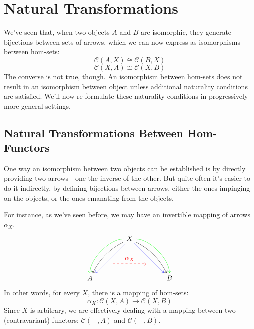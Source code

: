 \documentclass[DaoFP]{subfiles}
\begin{document}
\setcounter{chapter}{8}

\chapter{Natural Transformations}

We've seen that, when two objects $A$ and $B$ are isomorphic, they generate bijections between sets of arrows, which we can now express as isomorphisms between hom-sets:
\[\mathcal{C}(A, X) \cong \mathcal{C}(B, X)\]
\[\mathcal{C}(X, A) \cong \mathcal{C}(X, B)\]
The converse is not true, though. An isomorphism between hom-sets does not result in an isomorphism between object unless additional naturality conditions are satisfied. We'll now re-formulate these naturality conditions in progressively more general settings.

\section{Natural Transformations Between Hom-Functors}

One way an isomorphism between two objects can be established is by directly providing two arrows---one the inverse of the other. But quite often it's easier to do it indirectly, by defining bijections between arrows, either the ones impinging on the objects, or the ones emanating from the objects. 

For instance, as we've seen before, we may have an invertible mapping of arrows $\alpha_X$.
\[
 \begin{tikzcd}
 \node(x) at (0, 2) {X};
 \node(a) at (-2, 0) {A};
 \node(b) at (2, 0) {B};
 \node(c1) at (-1, 1.5) {};
 \node(c2) at (-1.5, 1) {};
 \node(c3) at (-1, 2) {};
 \node(c4) at (-2, 1) {};
 \node(d1) at (1, 1.5) {};
 \node(d2) at (1.5, 1) {};
 \node(d3) at (1, 2) {};
 \node(d4) at (2, 1) {};
\node (aa) at (-1, 0.75) {};
 \node (bb) at (1, 0.75) {};
 \draw[->] (x) .. controls (c1)  and (c2) .. (a); %
 \draw[->, green] (x) .. controls (c3)  and (c4) .. (a); %
 \draw[->, blue] (x) -- (a); 
  \draw[->] (x) .. controls (d1)  and (d2) .. (b); %
 \draw[->, green] (x) .. controls (d3)  and (d4) .. (b); %
 \draw[->, blue] (x) -- (b); 
 \draw[->, red, dashed] (aa) -- node[above]{\alpha_X} (bb);
 \end{tikzcd}
\]
In other words, for every $X$, there is a mapping of hom-sets:
\[ \alpha_X \colon \mathcal{C}(X, A) \to \mathcal{C}(X, B) \]
Since $X$ is arbitrary, we are effectively dealing with a mapping between two (contravariant) functors:  $\mathcal{C}(-, A)$ and $\mathcal{C}(-, B)$. 
\end{document}
